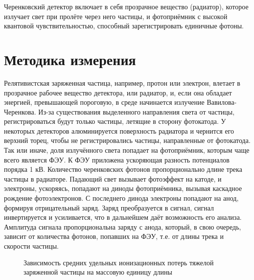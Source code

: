 \documentclass[12pt,a4paper]{report} %
\begin{document}
Черенковский детектор включает в себя прозрачное вещество (радиатор), которое излучает свет при пролёте через него частицы, и фотоприёмник с высокой квантовой чувствительностью, способный зарегистрировать единичные фотоны. 

\section{Методика измерения}

Релятивистская заряженная частица, например, протон или электрон, влетает в прозрачное рабочее вещество детектора, или радиатор, и, если она обладает энергией, превышающей пороговую, в среде начинается излучение Вавилова-Черенкова.
Из-за существования выделенного направления света от частицы, регистрироваться будут только частицы, летящие в сторону фотокатода.
У некоторых детекторов алюминируется поверхность радиатора и чернится его верхний торец, чтобы не регистрировались частицы, направленные от фотокатода.
Так или иначе, доля излучённого света попадает на фотоприёмник, которым чаще всего является ФЭУ. 
К ФЭУ приложена ускоряющая разность потенциалов порядка 1 кВ. 
Количество черенковских фотонов пропорционально длине трека частицы в радиаторе. 
Падающий свет вызывает фотоэффект на катоде, и электроны, ускоряясь, попадают на диноды фотоприёмника, вызывая каскадное рождение фотоэлектронов. 
С последнего динода электроны попадают на анод, формируя отрицательный заряд. 
Заряд преобразуется в сигнал, сигнал инвертируется и усиливается, что в дальнейшем даёт возможность его анализа. Амплитуда сигнала пропорциональна заряду с анода, который, в свою очередь, зависит от количества фотонов, попавших на ФЭУ, т.е. от длины трека и скорости частицы.
\begin{figure}[th]
	\noindent{}
	\caption{Зависимость средних удельных ионизационных потерь тяжелой заряженной частицы на массовую единицу длины}
	\label{pic:BetheBlokh}
\end{figure}
\end{document}
